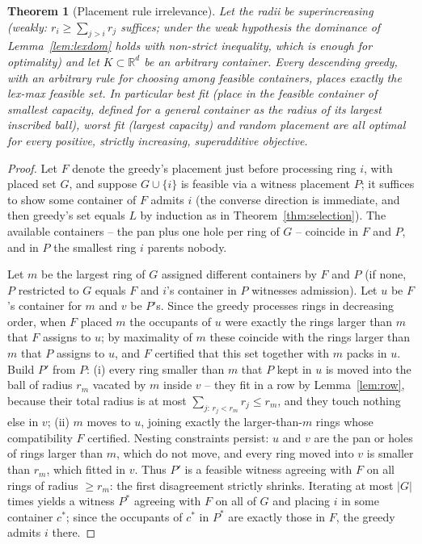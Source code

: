 \documentclass[11pt]{article}
\newtheorem{theorem}{Theorem}
\theoremstyle{definition}
\newcommand{\R}{\mathbb{R}}
\begin{document}
\begin{theorem}[Placement rule irrelevance]\label{thm:oblivious}
Let the radii be superincreasing (weakly: $r_i\ge\sum_{j>i}r_j$ suffices;
under the weak hypothesis the dominance of Lemma~\ref{lem:lexdom} holds with
non-strict inequality, which is enough for optimality) and
let $K\subset\R^d$ be an arbitrary container. Every descending greedy, with an
\emph{arbitrary} rule for choosing among feasible containers, places exactly
the lex-max feasible set. In particular best fit (place in the feasible
container of smallest capacity, defined for a general container as the radius
of its largest inscribed ball), worst fit (largest capacity) and random
placement are all optimal for every positive, strictly increasing,
superadditive objective.
\end{theorem}
\begin{proof}
Let $F$ denote the greedy's placement just before processing ring $i$, with
placed set $G$, and suppose $G\cup\{i\}$ is feasible via a witness placement
$P$; it suffices to show some container of $F$ admits $i$ (the converse
direction is immediate, and then greedy's set equals $L$ by induction as in
Theorem~\ref{thm:selection}). The available containers -- the pan plus one hole
per ring of $G$ -- coincide in $F$ and $P$, and in $P$ the smallest ring $i$
parents nobody.

Let $m$ be the largest ring of $G$ assigned different containers by $F$ and
$P$ (if none, $P$ restricted to $G$ equals $F$ and $i$'s container in $P$
witnesses admission). Let $u$ be $F$'s container for $m$ and $v$ be $P$'s.
Since the greedy processes rings in decreasing order, when $F$ placed $m$ the
occupants of $u$ were exactly the rings larger than $m$ that $F$ assigns to
$u$; by maximality of $m$ these coincide with the rings larger than $m$ that
$P$ assigns to $u$, and $F$ certified that this set together with $m$ packs in
$u$. Build $P'$ from $P$: (i) every ring smaller than $m$ that $P$ kept in $u$
is moved into the ball of radius $r_m$ vacated by $m$ inside $v$ -- they fit in
a row by Lemma~\ref{lem:row}, because their total radius is at most
$\sum_{j:\,r_j<r_m}r_j\le r_m$, and they touch nothing else in $v$;
(ii) $m$ moves to $u$, joining exactly the larger-than-$m$ rings whose
compatibility $F$ certified. Nesting constraints persist: $u$ and $v$ are the
pan or holes of rings larger than $m$, which do not move, and every ring moved
into $v$ is smaller than $r_m$, which fitted in $v$. Thus $P'$ is a feasible
witness agreeing with $F$ on all rings of radius $\ge r_m$: the first
disagreement strictly shrinks. Iterating at most $|G|$ times yields a witness
$P^{*}$ agreeing with $F$ on all of $G$ and placing $i$ in some container
$c^{*}$; since the occupants of $c^{*}$ in $P^{*}$ are exactly those in $F$,
the greedy admits $i$ there.
\end{proof}
\end{document}
